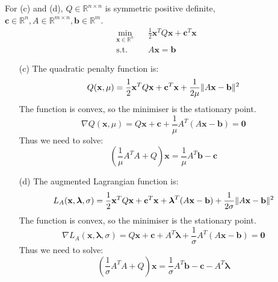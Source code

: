 \documentclass{article}
\DeclarePairedDelimiter{\norm}{\lVert}{\rVert}
\begin{document}
For (c) and (d), $Q\in\mathbb{R}^{n\times n}$ is symmetric positive definite, $\mathbf{c}\in\mathbb{R}^n, A\in\mathbb{R}^{m\times n},\mathbf{b}\in\mathbb{R}^m$.\begin{align*}
    \min_{\mathbf{x}\in\mathbb{R}^n} \ \ \ \ & \frac{1}{2}\mathbf{x}^TQ\mathbf{x}+\mathbf{c}^T\mathbf{x}\\
    \text{s.t. } \ \ \ & A\mathbf{x=b}
\end{align*}

\begin{itemize}
    \item[(c)] The quadratic penalty function is:
    \[Q(\mathbf{x},\mu) =
   \frac{1}{2}\mathbf{x}^TQ\mathbf{x}+\mathbf{c}^T\mathbf{x} + \frac{1}{2\mu} \norm{ A\mathbf{x-b}}^2
    \]
    The function is convex, so the minimiser is the stationary point.
    \[
    \nabla  Q(\mathbf{x},\mu) = Q\mathbf{x}+\mathbf{c}+\frac1\mu A^T(A\mathbf{x-b}) = \mathbf{0}
    \]
    Thus we need to solve:
    \[
    \left(\frac{1}{\mu}A^TA+Q\right)\mathbf{x} = \frac1\mu A^T\mathbf{b} - \mathbf{c}
    \]
    \item[(d)] The augmented Lagrangian function is:
    \[L_A(\mathbf{x},\boldsymbol\lambda,\sigma) =
   \frac{1}{2}\mathbf{x}^TQ\mathbf{x}+\mathbf{c}^T\mathbf{x} + \boldsymbol\lambda^T(A\mathbf{x-b})+ \frac{1}{2\sigma} \norm{ A\mathbf{x-b}}^2
    \]
    The function is convex, so the minimiser is the stationary point.
    \[
    \nabla  L_A(\mathbf{x},\boldsymbol\lambda,\sigma)  = Q\mathbf{x}+\mathbf{c}+A^T\boldsymbol\lambda+\frac1\sigma A^T(A\mathbf{x-b}) = \mathbf{0}
    \]
    Thus we need to solve:
    \[
    \left(\frac{1}{\sigma}A^TA+Q\right)\mathbf{x} = \frac1\sigma A^T\mathbf{b} - \mathbf{c} - A^T\boldsymbol\lambda
    \]
\end{itemize}
\end{document}
